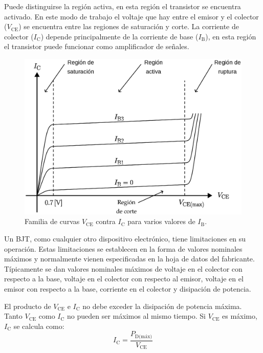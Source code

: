 Puede distinguirse la región activa, en esta región el transistor se encuentra
activado. En este modo de trabajo el voltaje que hay entre el emisor y el
colector ($V_{\text{CE}}$) se encuentra entre las regiones de saturación y
corte. La corriente de colector ($I_{\text{C}}$) depende principalmente de la
corriente de base ($I_{\text{B}}$), en esta región el transistor puede funcionar
como amplificador de señales.

\begin{figure}[!ht]
\centering
\includegraphics[scale=0.43]{diagramas/figura03.eps}
\caption{Familia de curvas $V_{\text{CE}}$ contra $I_{\text{C}}$ para varios
valores de $I_{\text{B}}$.}
\label{figura03}
\end{figure}

Un BJT, como cualquier otro dispositivo electrónico, tiene limitaciones en su
operación. Estas limitaciones se establecen en la forma de valores nominales
máximos y normalmente vienen especificadas en la hoja de datos del fabricante.
Típicamente se dan valores nominales máximos de voltaje en el colector con
respecto a la base, voltaje en el colector con respecto al emisor, voltaje en
el emisor con respecto a la base, corriente en el colector y disipación de
potencia.

El producto de $V_{\text{CE}}$ e $I_{\text{C}}$ no debe exceder la disipación de
potencia máxima. Tanto $V_{\text{CE}}$ como $I_{\text{C}}$ no pueden ser máximos
al mismo tiempo. Si $V_{\text{CE}}$ es máximo, $I_{\text{C}}$ se calcula como:
\begin{equation*}
    I_{\text{C}} = \frac{P_{\text{D(máx)}}}{V_{\text{CE}}}
\end{equation*}

